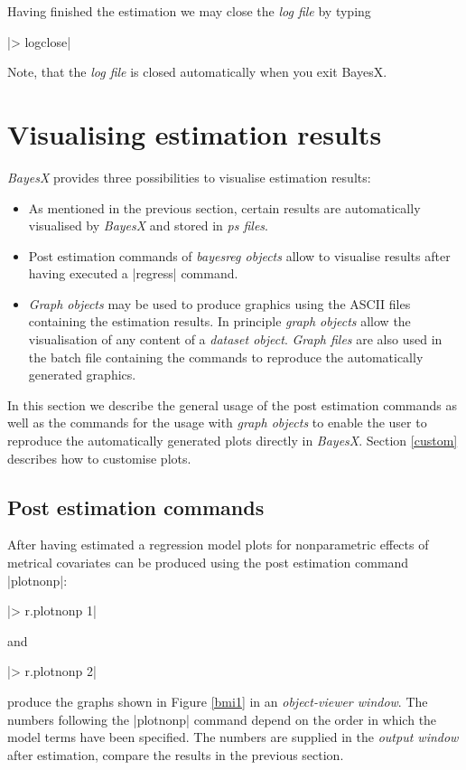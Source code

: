 \documentclass[a4paper]{article}
\begin{document}
Having finished the estimation we may close the {\it log file} by
typing

|> logclose|

Note, that the {\it log file} is closed automatically when you
exit BayesX.

\section{Visualising estimation results}\label{visual}

{\em BayesX} provides three possibilities to visualise estimation
results:
\begin{itemize}
\item As mentioned in the previous section, certain results are
automatically visualised by {\em BayesX} and stored in {\it ps
files}.
\item Post estimation commands of {\em bayesreg objects} allow to
visualise results after having executed a |regress| command.
\item {\em Graph objects} may be used to produce graphics using the ASCII files containing the estimation results.
In principle {\em graph objects} allow the visualisation of any
content of a {\em dataset object}. {\em Graph files} are also used
in the batch file containing the commands to reproduce the
automatically generated graphics.
\end{itemize}

In this section we describe the general usage of the post
estimation commands as well as the commands for the usage with
{\em graph objects} to enable the user to reproduce the
automatically generated plots directly in {\em BayesX}. Section
\ref{custom} describes how to customise plots.

\subsection{Post estimation commands}

After having estimated a regression model plots for nonparametric
effects of metrical covariates can be produced using the post
estimation command |plotnonp|:

|> r.plotnonp 1|

and

|> r.plotnonp 2|

produce the graphs shown in Figure \ref{bmi1} in an {\it
object-viewer window}. The numbers following the |plotnonp|
command depend on the order in which the model terms have been
specified. The numbers are supplied in the {\em output window}
after estimation, compare the results in the previous section.
\end{document}
